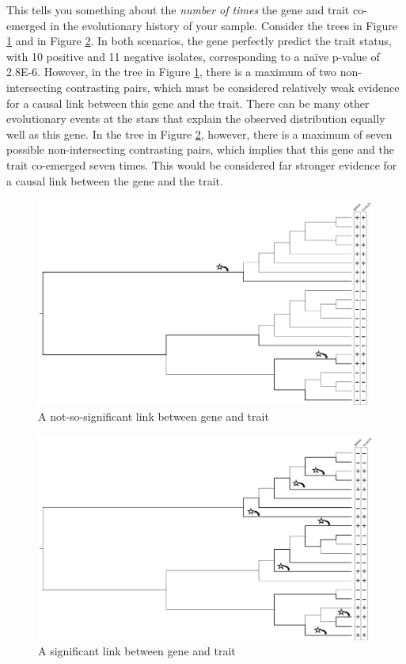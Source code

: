 \documentclass{article}
\begin{document}
    This tells you something about the \textit{number of times} the gene and trait co-emerged in the evolutionary history of your sample. Consider the trees in Figure \ref{fig:badlink} and in Figure \ref{fig:goodlink}. In both scenarios, the gene perfectly predict the trait status, with 10 positive and 11 negative isolates, corresponding to a naïve p-value of 2.8E-6. However, in the tree in Figure \ref{fig:badlink}, there is a maximum of two non-intersecting contrasting pairs, which must be considered relatively weak evidence for a causal link between this gene and the trait. There can be many other evolutionary events at the stars that explain the observed distribution equally well as this gene. In the tree in Figure \ref{fig:goodlink}, however, there is a maximum of seven possible non-intersecting contrasting pairs, which implies that this gene and the trait co-emerged seven times. This would be considered far stronger evidence for a causal link between the gene and the trait. \\

    \begin{figure}
      \includegraphics[width=\linewidth]{images/badlink.png}
      \caption{A not-so-significant link between gene and trait}
      \label{fig:badlink}
    \end{figure}

    \begin{figure}
      \includegraphics[width=\linewidth]{images/goodlink.png}
      \caption{A significant link between gene and trait}
      \label{fig:goodlink}
    \end{figure}
\end{document}
